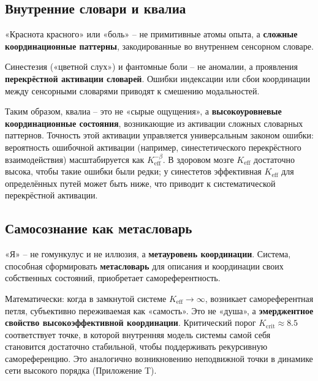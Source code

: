 \documentclass[12pt,a4paper]{article}
\newcommand{\eff}{\mathrm{eff}}
\newcommand{\Ke}{K_{\eff}}
\newcommand{\Kcrit}{K_{\mathrm{crit}}}
\begin{document}
	\subsection{Внутренние словари и квалиа}
	
	«Краснота красного» или «боль» – не примитивные атомы опыта, а \textbf{сложные координационные паттерны}, закодированные во внутреннем сенсорном словаре.
	
	\begin{tcolorbox}[title=Пример: Синестезия и фантомные боли]
		Синестезия («цветной слух») и фантомные боли – не аномалии, а проявления \textbf{перекрёстной активации словарей}. Ошибки индексации или сбои координации между сенсорными словарями приводят к смешению модальностей.
	\end{tcolorbox}
	
	Таким образом, квалиа – это не «сырые ощущения», а \textbf{высокоуровневые координационные состояния}, возникающие из активации сложных словарных паттернов. Точность этой активации управляется универсальным законом ошибки: вероятность ошибочной активации (например, синестетического перекрёстного взаимодействия) масштабируется как $\Ke^{-\beta}$. В здоровом мозге $\Ke$ достаточно высока, чтобы такие ошибки были редки; у синестетов эффективная $\Ke$ для определённых путей может быть ниже, что приводит к систематической перекрёстной активации.
	
	\subsection{Самосознание как метасловарь}
	
	«Я» – не гомункулус и не иллюзия, а \textbf{метауровень координации}. Система, способная сформировать \textbf{метасловарь} для описания и координации своих собственных состояний, приобретает самореферентность.
	
	Математически: когда в замкнутой системе $\Ke \to \infty$, возникает самореферентная петля, субъективно переживаемая как «самость». Это не «душа», а \textbf{эмерджентное свойство высокоэффективной координации}. Критический порог $\Kcrit \approx 8.5$ соответствует точке, в которой внутренняя модель системы самой себя становится достаточно стабильной, чтобы поддерживать рекурсивную самореференцию. Это аналогично возникновению неподвижной точки в динамике сети высокого порядка (Приложение T).
	
\end{document}
